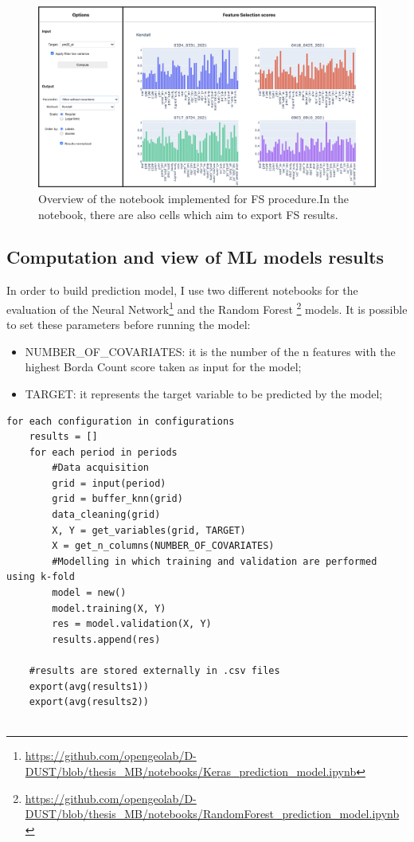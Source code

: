 \begin{figure}[H]
    \centering
    \includegraphics[scale=0.40]{images/notebook.png}
    \caption{Overview of the notebook implemented for FS procedure.In the notebook, there are also cells which aim to export FS results.}
    \label{fig:notebook}
\end{figure}
\pagebreak


\subsection{Computation and view of ML models results}
In order to build prediction model, I use two different notebooks for the evaluation of the Neural Network\footnote{\url{https://github.com/opengeolab/D-DUST/blob/thesis_MB/notebooks/Keras_prediction_model.ipynb}} and the Random Forest \footnote{\url{https://github.com/opengeolab/D-DUST/blob/thesis_MB/notebooks/RandomForest_prediction_model.ipynb}} models. 
It is possible to set these parameters before running the model:
\begin{itemize}
    \item NUMBER\_OF\_COVARIATES: it is the number of the n features with the highest Borda Count score taken as input for the model;
    \item TARGET: it represents the target variable to be predicted by the model;
\end{itemize}
\begin{verbatim}
for each configuration in configurations
    results = []
    for each period in periods
        #Data acquisition
        grid = input(period)
        grid = buffer_knn(grid)
        data_cleaning(grid)
        X, Y = get_variables(grid, TARGET)
        X = get_n_columns(NUMBER_OF_COVARIATES)
        #Modelling in which training and validation are performed using k-fold
        model = new()
        model.training(X, Y)
        res = model.validation(X, Y)
        results.append(res)
    
    #results are stored externally in .csv files
    export(avg(results1))
    export(avg(results2))
 
\end{verbatim}

